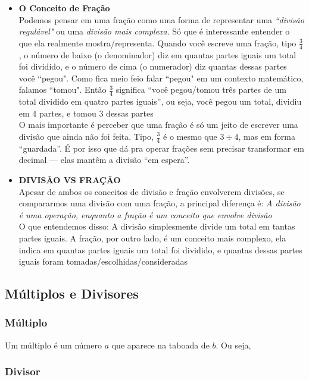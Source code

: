 \documentclass{article}
\begin{document}
\begin{itemize}
    \item \textbf{O Conceito de Fração}\\[5pt] Podemos pensar em uma fração como uma forma de representar uma \textit{``divisão regulável"} ou uma \textit{divisão mais complexa}. Só que é interessante entender o que ela realmente mostra/representa. Quando você escreve uma fração, tipo $\frac{3}{4}$, o número de baixo (o denominador) diz em quantas partes iguais um total foi dividido, e o número de cima (o numerador) diz quantas dessas partes você ``pegou". Como fica meio feio falar ``pegou" em um contexto matemático, falamos ``tomou". Então $\frac{3}{4}$ significa “você pegou/tomou três partes de um total dividido em quatro partes iguais”, ou seja, você pegou um total, dividiu em 4 partes, e tomou 3 dessas partes
    \\[5pt]
    O mais importante é perceber que uma fração é só um jeito de escrever uma divisão que ainda não foi feita. Tipo, $\frac{3}{4}$ é o mesmo que $3 \div 4$, mas em forma “guardada”. É por isso que dá pra operar frações sem precisar transformar em decimal — elas mantêm a divisão “em espera”.

    \item \textbf{DIVISÃO VS FRAÇÃO}\\[5pt] Apesar de ambos os conceitos de divisão e fração envolverem divisões, se compararmos uma divisão com uma fração, a principal diferença é: \textit{A divisão é uma operação, enquanto a fração é um conceito que envolve divisão}
    \\[5pt]
    O que entendemos disso: A divisão simplesmente divide um total em tantas partes iguais. A fração, por outro lado, é um conceito mais complexo, ela indica em quantas partes iguais um total foi dividido, e quantas dessas partes iguais foram tomadas/escolhidas/consideradas
\end{itemize}

\subsection{Múltiplos e Divisores}

\subsubsection{Múltiplo}
Um múltiplo é um número $a$ que aparece na taboada de $b$. Ou seja,

\subsubsection{Divisor}
\end{document}
